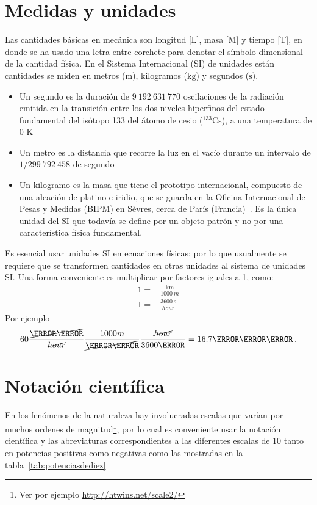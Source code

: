 \section{Medidas y unidades}
Las cantidades básicas en mecánica son longitud [L], masa [M] y tiempo [T], en donde se ha usado una letra entre corchete para denotar el símbolo dimensional de la cantidad física. En el Sistema Internacional (SI) de unidades están cantidades se miden en metros ($\si{\meter}$), kilogramos ($\si{\kilo\gram}$) y segundos ($\si{\second}$).
\begin{frame}
\begin{itemize}
\item Un segundo es la duración de $9\ 192\ 631\ 770$ oscilaciones de la radiación emitida en la transición entre los dos niveles hiperfinos del estado fundamental del isótopo 133 del átomo de cesio (${}^{133}$Cs), a una temperatura de 0 K~\cite{wikipedia}
\item Un metro es la distancia que recorre la luz en el vacío durante un intervalo de $1/299\ 792\ 458$ de segundo~\cite{wikipedia}
\item Un kilogramo es la masa que tiene el prototipo internacional, compuesto de una aleación de platino e iridio, que se guarda en la Oficina Internacional de Pesas y Medidas (BIPM) en Sèvres, cerca de París (Francia)~\cite{wikipedia}.
Es la única unidad del SI que todavía se define por un objeto patrón y no por una característica física fundamental.
\end{itemize}
  
\end{frame}

Es esencial usar unidades SI en ecuaciones físicas; por lo que usualmente se requiere que se transformen cantidades en otras unidades al sistema de unidades SI. Una forma conveniente es multiplicar por factores iguales a 1, como:
\begin{align}
  1=&\frac{\si{\kilo\meter}}{\SI{1000}{m}}\nonumber\\
  1=&\frac{\SI{3600}{\second}}{\si{hour}}
\end{align}
Por ejemplo
\begin{align}
 60\frac{\cancel{\si{\kilo\meter}}}{\cancel{\si{hour}}}
 \frac{\SI{1000}{m}}{\cancel{\si{\kilo\meter}}}
 \frac{\cancel{\si{hour}}}{\SI{3600}{\second}}
=\SI{16.7}{\meter\per\second}\,.
\end{align}

\section{Notación científica}
En los fenómenos de la naturaleza hay involucradas escalas que varían por muchos ordenes de magnitud\footnote{Ver por ejemplo \url{http://htwins.net/scale2/}}, por lo cual es conveniente usar la notación científica y las abreviaturas correspondientes a las diferentes escalas de 10 tanto en potencias positivas como negativas como las mostradas en la tabla~\ref{tab:potenciasdediez}

